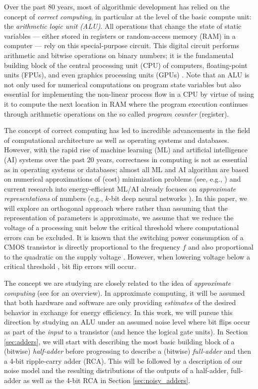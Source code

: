 Over the past 80 years, most of algorithmic development has relied on the concept of {\em correct computing}, in particular at the level of the basic compute unit: the {\em arithmetic logic unit (ALU)}. All operations that change the state of static variables --- either stored in registers or random-access memory (RAM) in a computer --- rely on this special-purpose circuit. This digital circuit performs arithmetic and bitwise operations on binary numbers; it is the fundamental building block of the central processing unit (CPU) of computers, floating-point units (FPUs), and even graphics processing units (GPUs) \cite{HamVraZak2012i}. Note that an ALU is not only used for numerical computations on program state variables but also essential for implementing the non-linear process flow in a CPU by virtue of using it to compute the next location in RAM where the program execution continues through arithmetic operations on the so called {\em program counter} (register).

The concept of correct computing has led to incredible advancements in the field of computational architecture as well as operating systems and databases. However, with the rapid rise of machine learning (ML) and artificial intelligence (AI) systems over the past 20 years, correctness in computing is not as essential as in operating systems or databases; almost all ML and AI algorithm are based on numerical approximations of (cost) minimization problems (see, e.g., \cite{Mit1997a,Bis2006i,Mur2012q}) and current research into energy-efficient ML/AI already focuses on {\em approximate representations} of numbers (e.g., $k$-bit deep neural networks \cite{CouBenDav2015y}). In this paper, we will explore an orthogonal approach where rather than assuming that the representation of parameters is approximate, we assume that we reduce the voltage of a processing unit below the critical threshold where computational errors can be excluded. It is known that the switching power consumption of a CMOS transistor is directly proportional to the frequency $f$ and also proportional to the quadratic on the supply voltage \cite[Subsection 4.1.2]{St2014a}. However, when lowering voltage below a critical threshold \cite{OnuYukSal2020g}, bit flip errors will occur.

The concept we are studying are closely related to the idea of {\em approximate computing} (see \cite{XuMytKim2022a} for an overview). In approximate computing, it will be assumed that both hardware and software are only providing {\em estimates} of the desired behavior in exchange for energy efficiency. In this work, we will pursue this direction by  studying an ALU under an assumed noise level where bit flips occur as part of the {\em input} to a transistor (and hence the logical gate units). In Section \ref{sec:adders}, we will start with describing the most basic building block of a (bitwise) {\em half-adder} before progressing to describe a (bitwise) {\em full-adder} and then a 4-bit ripple-carry adder (RCA). This will be followed by a description of our noise model and the resulting distributions of the outputs of a half-adder, full-adder as well as the 4-bit RCA in Section \ref{sec:noisy_adders}.

